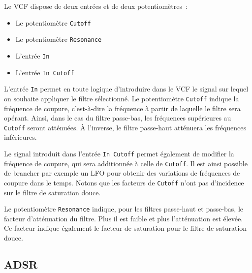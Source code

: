 \documentclass[a4paper,oneside,frenchb,10pt]{article}
\begin{document}
Le VCF dispose de deux entrées et de deux potentiomètres~:

\begin{itemize}
\item
  Le potentiomètre \verb!Cutoff!
\item
  Le potentiomètre \verb!Resonance!
\item
  L'entrée \verb!In!
\item
  L'entrée \verb!In Cutoff!
\end{itemize}
L'entrée \verb!In! permet en toute logique d'introduire dans le VCF le
signal sur lequel on souhaite appliquer le filtre sélectionné. Le
potentiomètre \verb!Cutoff! indique la fréquence de coupure,
c'est-à-dire la fréquence à partir de laquelle le filtre sera opérant.
Ainsi, dans le cas du filtre passe-bas, les fréquences supérieures au
\verb!Cutoff! seront atténuées. À l'inverse, le filtre passe-haut
atténuera les fréquences inférieures.

Le signal introduit dans l'entrée \verb!In Cutoff! permet également de
modifier la fréquence de coupure, qui sera additionnée à celle de
\verb!Cutoff!. Il est ainsi possible de brancher par exemple un LFO pour
obtenir des variations de fréquences de coupure dans le temps. Notons
que les facteurs de \verb!Cutoff! n'ont pas d'incidence sur le filtre de
saturation douce.

Le potentiomètre \verb!Resonance! indique, pour les filtres passe-haut
et passe-bas, le facteur d'atténuation du filtre. Plus il est faible et
plus l'atténuation est élevée. Ce facteur indique également le facteur
de saturation pour le filtre de saturation douce.

\subsection{ADSR}
\end{document}
